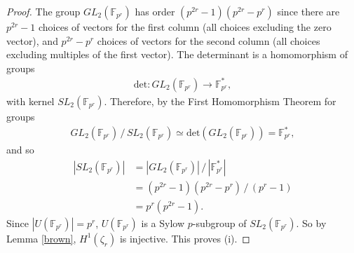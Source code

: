 \begin{proof}
The group $GL_2(\mathbb{F}_{p^r})$ has order $(p^{2r} - 1)(p^{2r} - p^r)$ since there are $p^{2r} - 1$ choices of vectors for the first column (all choices excluding the zero vector), and $p^{2r} - p^r$ choices of vectors for the second column (all choices excluding multiples of the first vector). The determinant is a homomorphism of groups
	\begin{align}
		\mathrm{det}:GL_2(\mathbb{F}_{p^r}) \rightarrow \mathbb{F}^*_{p^r},
	\end{align}
	with kernel $SL_2(\mathbb{F}_{p^r})$. Therefore, by the First Homomorphism Theorem for groups
	\begin{align}
		GL_2(\mathbb{F}_{p^r})\,/\,SL_2(\mathbb{F}_{p^r}) \simeq \mathrm{det}(GL_2(\mathbb{F}_{p^r})) = \mathbb{F}^*_{p^r},
	\end{align}
	and so
	\begin{align*}
		|SL_2(\mathbb{F}_{p^r})|
		&=  |GL_2(\mathbb{F}_{p^r})|\,/\,|\mathbb{F}^*_{p^r}|\\
		&=  (p^{2r} - 1)(p^{2r} - p^r)\,/\,(p^r - 1)\\
		&=  p^r(p^{2r} - 1).
	\end{align*}
	Since $|U(\mathbb{F}_{p^r})| = p^r$, $U(\mathbb{F}_{p^r})$ is a Sylow $p$-subgroup of $SL_2(\mathbb{F}_{p^r})$.
So by Lemma \ref{brown}, $H^1(\zeta_r)$ is injective. This proves (i).
	

\end{proof}
